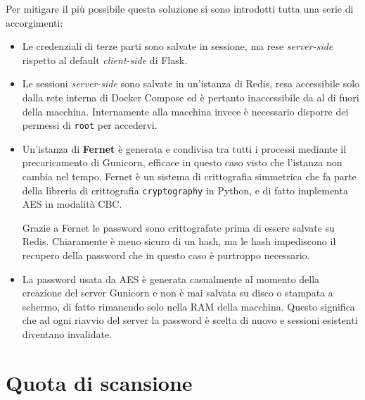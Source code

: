 Per mitigare il più possibile questa soluzione si sono introdotti tutta una serie di accorgimenti:
\begin{itemize}
    \item Le credenziali di terze parti sono salvate in sessione, ma rese \emph{server-side} rispetto al default \emph{client-side} di Flask.
    \item Le sessioni \emph{server-side} sono salvate in un'istanza di Redis, resa accessibile solo dalla rete interna di Docker Compose ed è pertanto inaccessibile da al di fuori della macchina. Internamente alla macchina invece è necessario disporre dei permessi di \texttt{root} per accedervi.
    \item Un'istanza di \textbf{Fernet} è generata e condivisa tra tutti i processi mediante il precaricamento di Gunicorn, efficace in questo caso visto che l'istanza non cambia nel tempo. Fernet è un sistema di crittografia simmetrica che fa parte della libreria di crittografia \texttt{cryptography} in Python, e di fatto implementa AES in modalità CBC.
    
    Grazie a Fernet le password sono crittografate prima di essere salvate su Redis. Chiaramente è meno sicuro di un hash, ma le hash impediscono il recupero della password che in questo caso è purtroppo necessario.
    \item La password usata da AES è generata casualmente al momento della creazione del server Gunicorn e non è mai salvata su disco o stampata a schermo, di fatto rimanendo solo nella RAM della macchina. Questo significa che ad ogni riavvio del server la password è scelta di nuovo e sessioni esistenti diventano invalidate.
\end{itemize}

\section{Quota di scansione}